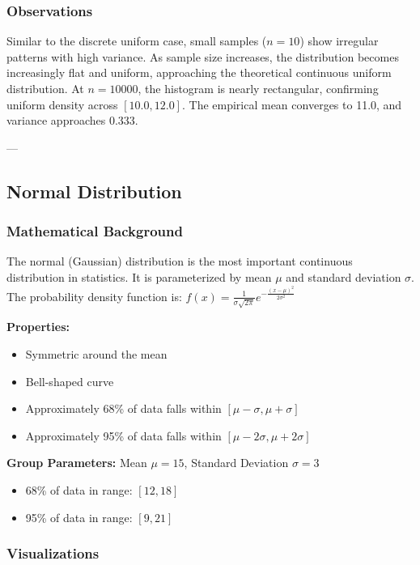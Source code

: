 \documentclass[12pt]{article}
\begin{document}
\subsubsection{Observations}

Similar to the discrete uniform case, small samples ($n=10$) show irregular patterns with high variance. As sample size increases, the distribution becomes increasingly flat and uniform, approaching the theoretical continuous uniform distribution. At $n=10000$, the histogram is nearly rectangular, confirming uniform density across $[10.0, 12.0]$. The empirical mean converges to 11.0, and variance approaches 0.333.

---

\subsection{Normal Distribution}

\subsubsection{Mathematical Background}

The normal (Gaussian) distribution is the most important continuous distribution in statistics. It is parameterized by mean $\mu$ and standard deviation $\sigma$. The probability density function is: $f(x) = \frac{1}{\sigma\sqrt{2\pi}} e^{-\frac{(x-\mu)^2}{2\sigma^2}}$

\textbf{Properties:}
\begin{itemize}
    \item Symmetric around the mean
    \item Bell-shaped curve
    \item Approximately 68\% of data falls within $[\mu - \sigma, \mu + \sigma]$
    \item Approximately 95\% of data falls within $[\mu - 2\sigma, \mu + 2\sigma]$
\end{itemize}

\textbf{Group Parameters:} Mean $\mu = 15$, Standard Deviation $\sigma = 3$
\begin{itemize}
    \item 68\% of data in range: $[12, 18]$
    \item 95\% of data in range: $[9, 21]$
\end{itemize}

\subsubsection{Visualizations}
\end{document}
